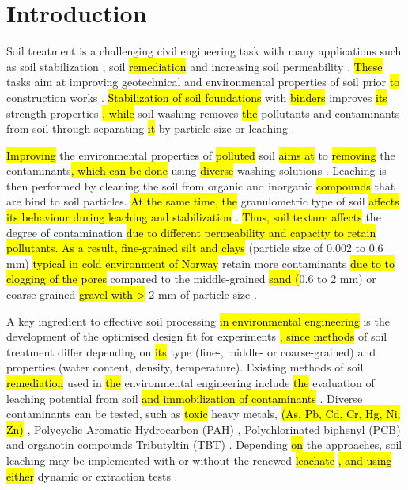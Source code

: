 \documentclass[algorithms,article,submit,pdftex,moreauthors]{Definitions/mdpi}
\begin{document}
\section{Introduction}

Soil treatment is a challenging civil engineering task with many applications\hl{ }such as soil stabilization \cite{ref1,ma16113996,Yietal2014,app13084880}, soil \hl{remediation} \cite{Benschoten,Chu,Bhandari} and increasing soil permeability \cite{Rangeard,Lemenkova202222,Schultz}. \hl{These} tasks aim at improving geotechnical and environmental properties of soil prior \hl{to} construction works \cite{Mohammedetal,Zayyat,SHEOB2023,Tiwari}. \hl{Stabilization of soil foundations }with\hl{ binders} improves \hl{its }strength properties \cite{DHARINI2023,ELHARIRI202347,Eissa,ZHANG2023131887,HogentoglerWillis}\hl{, while }soil washing removes \hl{the }pollutants and contaminants from soil through separating \hl{it} by particle size or leaching \cite{Fristad,Finney,Hanson}. 

\hl{Improving} the environmental properties of \hl{polluted }soil \hl{aims at} to \hl{removing} the contaminants\hl{, which can be done }using\hl{ diverse} washing solutions \cite{He,Mizutani2016}. Leaching is then performed by cleaning the soil from organic and inorganic \hl{compounds} that are bind to soil particles. \hl{At the same time, the} granulometric type of\hl{ }soil \hl{ affects its behaviour during leaching and stabilization} \cite{Hoang,Schaefers,Krisdani}. \hl{Thus, soil texture affects }the degree of\hl{ }contamination \hl{due to different permeability and capacity to retain pollutants. As a result, fine-grained silt and clays }(particle size of 0.002 to 0.6 mm)\hl{ typical in cold environment of Norway} \cite{Bache,Andersen,Zhangetal2020} retain\hl{ }more contaminants \hl{due to to clogging of the pores }compared to the middle-grained \hl{sand (}0.6 to 2 mm) or coarse-grained \hl{gravel with >} 2 mm of particle size\hl{ }\cite{Binner,Kulkarni}. 

A key ingredient to effective soil processing \hl{in environmental engineering }is the development of the optimised design fit for experiments\hl{ } \cite{Rahinah,Ninic,Lemenkova202226,Zhang,Lemenkova202309,Wei}\hl{, since methods} of soil treatment differ depending on \hl{its }type (fine-, middle- or coarse-grained) and properties (water content, density, temperature). Existing methods of soil \hl{remediation} used in \hl{the }environmental engineering include \hl{the }evaluation of leaching potential from soil \hl{and immobilization of contaminants} \cite{Mohammedetal2016,Simonetal}. Diverse contaminants can be tested, such as \hl{toxic }heavy metals, \hl{(As, Pb, Cd, Cr, Hg, Ni, Zn)} \cite{Naghipour,WangTabbaa,LiLi,Xia}, Polycyclic Aromatic Hydrocarbon (PAH) \cite{Liang}, Polychlorinated biphenyl (PCB) \cite{Aydilek} and organotin compounds Tributyltin (TBT) \cite{KUCHARSKI2022136133,Lemenkova202214,MARCIC20062322,Lemenkova202131}. Depending \hl{on} the approaches, soil leaching\hl{ }may be implemented with or without the renewed \hl{leachate} \cite{1997579}\hl{, and using either }dynamic or extraction tests \cite{Lemenkova202208}. 
\end{document}
